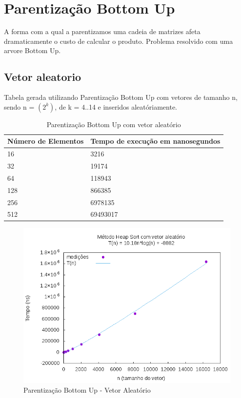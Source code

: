 \documentclass[12pt,a4paper,twoside]{report}
\begin{document}
\section{Parentização Bottom Up}

A forma com a qual a parentizamos uma cadeia de matrizes afeta dramaticamente o custo de calcular o produto. Problema resolvido com uma arvore Bottom Up.

\subsection{Vetor aleatorio}
Tabela gerada utilizando Parentização Bottom Up com vetores de tamanho n, sendo n = $(2^k)$, de k = 4..14 e inseridos aleatóriamente.
\begin{table}[H]
\centering
\caption{Parentização Bottom Up com vetor aleatório}
\label{my-label}
\begin{tabular}{|l|l|}
\hline
\multicolumn{1}{|c|}{\textbf{Número de Elementos}} & \multicolumn{1}{c|}{\textbf{Tempo de execução em nanosegundos}} \\ \hline
16 & 3216 \\ \hline
32 & 19174 \\ \hline
64 & 118943 \\ \hline
128 & 866385 \\ \hline
256 & 6978135 \\ \hline
512 & 69493017 \\ \hline
\end{tabular}
\end{table}

\begin{figure}[H]
    \centering
    \includegraphics[width=0.7\linewidth]{graficos/HeapSort/vIntAleatorio/vIntAleatorio.png}
  \caption{Parentização Bottom Up - Vetor Aleatório}
\end{figure}
\end{document}
